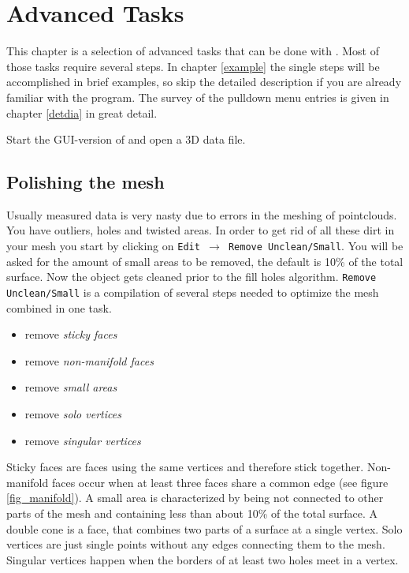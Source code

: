 \chapter{Advanced Tasks}
\label{tasks}
This chapter is a selection of advanced tasks that can be done with \GigaMesh\!\!. Most of those tasks require several steps. In chapter \ref{example} the single steps will be accomplished in  brief examples, so skip the detailed description if you are already familiar with the program. The survey of the pulldown menu entries is given in chapter \ref{detdia} in great detail. 

Start the GUI-version of  \GigaMesh and open a 3D data file.

\section{Polishing the mesh}\label{GMOCFP}
Usually measured data is very nasty due to errors in the meshing of pointclouds. You have outliers, holes and twisted areas. In order to get rid of all these dirt in your mesh you
start by clicking on \texttt{Edit $\rightarrow$ Remove Unclean/Small}. You will be asked for the amount of small areas to be removed, the default is 10\% of the total surface. Now  the object gets cleaned prior to the fill holes algorithm. {\tt Remove Unclean/Small} is a compilation of several steps needed to optimize the mesh combined in one task. 

\begin{itemize}
\item remove {\em sticky faces} 
\item remove {\em non-manifold faces} 
\item remove {\em small areas} 
\item remove {\em solo vertices}
\item remove {\em singular vertices}
\end{itemize}

Sticky faces are faces using the same vertices and therefore stick together. Non-manifold faces occur when at least three faces share a common edge (see figure \ref{fig_manifold}). A small area is characterized by being not connected to other parts of the mesh and containing less than about 10\% of the total surface. A double cone is a face, that combines two parts of a surface at a single vertex. Solo vertices are  just single points without any edges connecting them to the mesh. Singular vertices happen when the borders of at least two holes meet in a vertex.

